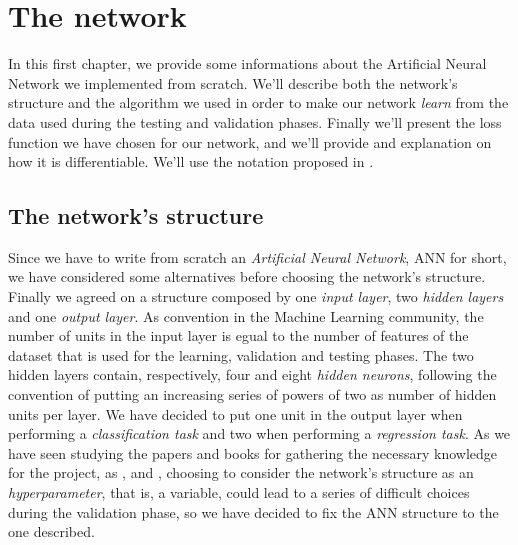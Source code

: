 \chapter{The network} %
\label{cha:the_network}
	\noindent
	In this first chapter, we provide some informations about the Artificial Neural Network we implemented from
	scratch. We'll describe both the network's structure and the algorithm we used in order to make our network
	\textit{learn} from the data used during the testing and validation phases. Finally we'll present the loss
	function we have chosen for our network, and we'll provide and explanation on how it is differentiable. We'll
	use the notation proposed in \cite{Goodfellow-et-al-2016}.

	\section{The network's structure} %
	\label{sec:the_network_s_structure}
		\noindent
		Since we have to write from scratch an \textit{Artificial Neural Network}, ANN for short, we have
		considered some alternatives before choosing the network's structure. Finally we agreed on a structure
		composed by one \textit{input layer}, two \textit{hidden layers} and one \textit{output layer}. As
		convention in the Machine Learning community, the number of units in the input layer is egual to the number
		of features of the dataset that is used for the learning, validation and testing phases. The two
		hidden layers contain, respectively, four and eight \textit{hidden neurons}, following the convention of
		putting an increasing series of powers of two as number of hidden units per layer. We have decided to put
		one unit in the output layer when performing a \textit{classification task} and two when performing a
		\textit{regression task}. As we have seen studying the papers and books for gathering the necessary
		knowledge for the project, as \cite{Goodfellow-et-al-2016}, \cite{haykin2009neural} and
		\cite{mitchell1997machine}, choosing to consider the network's structure as an \textit{hyperparameter},
		that is, a variable, could lead to a series of difficult choices during the validation phase, so we have
		decided to fix the ANN structure to the one described.

